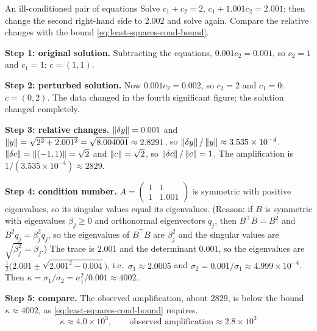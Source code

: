 \begin{sample}{An ill-conditioned pair of equations}
Solve $c_1 + c_2 = 2$, $c_1 + 1.001c_2 = 2.001$; then change the second right-hand side to $2.002$ and solve again. Compare the relative changes with the bound \cref{eq:least-squares-cond-bound}.

\textbf{Step 1: original solution.} Subtracting the equations, $0.001c_2 = 0.001$, so $c_2 = 1$ and $c_1 = 1$: $c = (1,1)$.

\textbf{Step 2: perturbed solution.} Now $0.001 c_2 = 0.002$, so $c_2 = 2$ and $c_1 = 0$: $c = (0,2)$. The data changed in the fourth significant figure; the solution changed completely.

\textbf{Step 3: relative changes.} $\left\lVert \delta y\right\rVert = 0.001$ and $\left\lVert y\right\rVert = \sqrt{2^2 + 2.001^2} = \sqrt{8.004001}\approx 2.8291$, so $\left\lVert \delta y\right\rVert/\left\lVert y\right\rVert\approx3.535\times10^{-4}$. $\left\lVert \delta c\right\rVert = \left\lVert (-1,1)\right\rVert = \sqrt2$ and $\left\lVert c\right\rVert = \sqrt2$, so $\left\lVert \delta c\right\rVert/\left\lVert c\right\rVert = 1$. The amplification is $1/(3.535\times10^{-4})\approx 2829$.

\textbf{Step 4: condition number.} $A = \begin{pmatrix}1&1\\1&1.001\end{pmatrix}$ is symmetric with positive eigenvalues, so its singular values equal its eigenvalues. (Reason: if $B$ is symmetric with eigenvalues $\beta_j\ge0$ and orthonormal eigenvectors $q_j$, then $B^\top B = B^2$ and $B^2q_j = \beta_j^2q_j$, so the eigenvalues of $B^\top B$ are $\beta_j^2$ and the singular values are $\sqrt{\beta_j^2} = \beta_j$.) The trace is $2.001$ and the determinant $0.001$, so the eigenvalues are $\frac12\bigl(2.001\pm\sqrt{2.001^2 - 0.004}\bigr)$, i.e.\ $\sigma_1\approx2.0005$ and $\sigma_2 = 0.001/\sigma_1\approx 4.999\times10^{-4}$. Then $\kappa = \sigma_1/\sigma_2 = \sigma_1^2/0.001\approx 4002$.

\textbf{Step 5: compare.} The observed amplification, about $2829$, is below the bound $\kappa\approx4002$, as \cref{eq:least-squares-cond-bound} requires.
\[
\boxed{\,\kappa\approx 4.0\times10^3,\qquad \text{observed amplification}\approx 2.8\times10^3\,}
\]
\end{sample}

